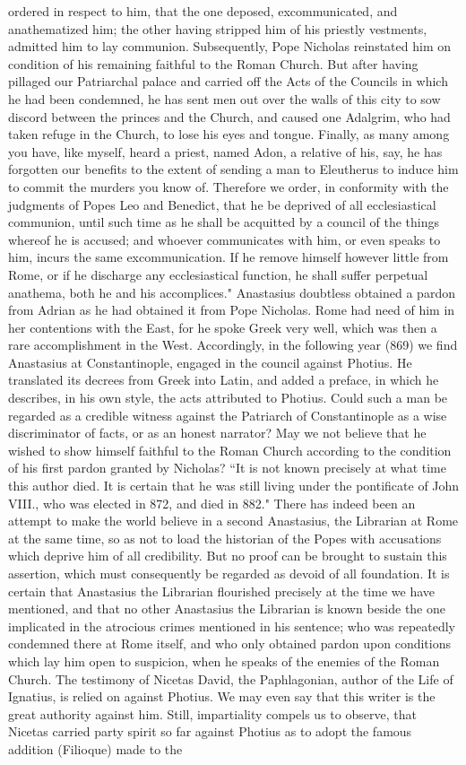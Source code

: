 ordered in respect to him, that the one deposed, excommunicated, and anathematized him; the other having stripped him of his priestly vestments, admitted him to lay communion. Subsequently, Pope Nicholas reinstated him on condition of his remaining faithful to the Roman Church. But after having pillaged our Patriarchal palace and carried off the Acts of the Councils in which he had been condemned, he has sent men out over the walls of this city to sow discord between the princes and the Church, and caused one Adalgrim, who had taken refuge in the Church, to lose his eyes and tongue. Finally, as many among you have, like myself, heard a priest, named Adon, a relative of his, say, he has forgotten our benefits to the extent of sending a man to Eleutherus to induce him to commit the murders you know of. Therefore we order, in conformity with the judgments of Popes Leo and Benedict, that he be deprived of all ecclesiastical communion, until such time as he shall be acquitted by a council of the things whereof he is accused; and whoever communicates with him, or even speaks to him, incurs the same excommunication. If he remove himself however little from Rome, or if he discharge any ecclesiastical function, he shall suffer perpetual anathema, both he and his accomplices." Anastasius doubtless obtained a pardon from Adrian as he had obtained it from Pope Nicholas. Rome had need of him in her contentions with the East, for he spoke Greek very well, which was then a rare accomplishment in the West. Accordingly, in the following year (869) we find Anastasius at Constantinople, engaged in the council against Photius. He translated its decrees from Greek into Latin, and added a preface, in which he describes, in his own style, the acts attributed to Photius. Could such a man be regarded as a credible witness against the Patriarch of Constantinople as a wise discriminator of facts, or as an honest narrator? May we not believe that he wished to show himself faithful to the Roman Church according to the condition of his first pardon granted by Nicholas? “It is not known precisely at what time this author died. It is certain that he was still living under the pontificate of John VIII., who was elected in 872, and died in 882." There has indeed been an attempt to make the world believe in a second Anastasius, the Librarian at Rome at the same time, so as not to load the historian of the Popes with accusations which deprive him of all credibility. But no proof can be brought to sustain this assertion, which must consequently be regarded as devoid of all foundation. It is certain that Anastasius the Librarian flourished precisely at the time we have mentioned, and that no other Anastasius the Librarian is known beside the one implicated in the atrocious crimes mentioned in his sentence; who was repeatedly condemned there at Rome itself, and who only obtained pardon upon conditions which lay him open to suspicion, when he speaks of the enemies of the Roman Church. The testimony of Nicetas David, the Paphlagonian, author of the Life of Ignatius, is relied on against Photius. We may even say that this writer is the great authority against him. Still, impartiality compels us to observe, that Nicetas carried party spirit so far against Photius as to adopt the famous addition (Filioque) made to the 
